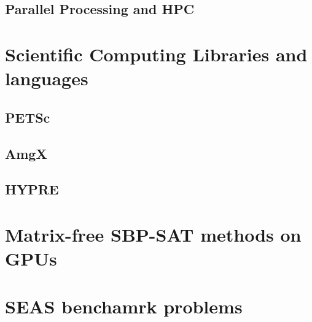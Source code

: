 \section{Parallel Processing and HPC}



\chapter{Scientific Computing Libraries and languages}
\section{PETSc}

\section{AmgX}

\section{HYPRE}





\chapter{Matrix-free SBP-SAT methods on GPUs}



\chapter{SEAS benchamrk problems}




